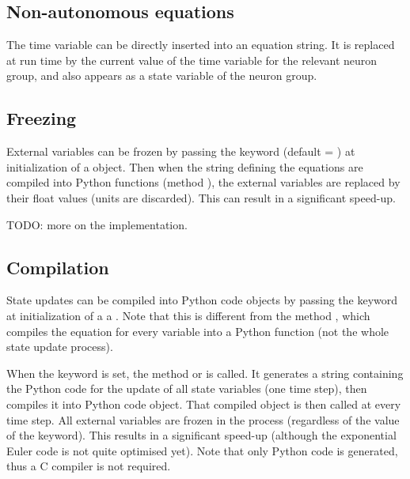 \documentclass[letterpaper,10pt,english]{manual}
\begin{document}
\subsection{Non-autonomous equations}

The time variable  can be directly inserted into an equation string.
It is replaced at run time by the current value of the time variable for the relevant
neuron group, and also appears as a state variable of the neuron group.

\subsection{Freezing}

External variables can be frozen by passing the keyword 
(default = ) at initialization of a \hyperlink{brian.NeuronGroup}{} object.
Then when the string defining the equations are compiled into Python functions
(method ),
the external variables are replaced by their float values (units are discarded).
This can result in a significant speed-up.

TODO: more on the implementation.

\subsection{Compilation}

State updates can be compiled into Python code objects by passing the keyword
 at initialization of a a \hyperlink{brian.NeuronGroup}{}.
Note that this is different from the method ,
which compiles the equation for every variable into a Python function
(not the whole state update process).

When the  keyword is set, the method 
or  is called. It generates
a string containing the Python code for the update of all state variables (one time step),
then compiles it into Python code object. That compiled object is then called at every time step.
All external variables are frozen in the process (regardless of the value of the  keyword).
This results in a significant speed-up (although the exponential Euler code is not
quite optimised yet). Note that only Python code is generated, thus a
C compiler is not required.
\end{document}
